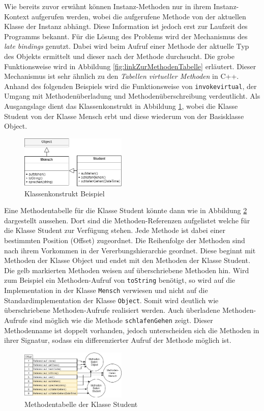 \documentclass[conference]{IEEEtran}
\begin{document}
Wie bereits zuvor erwähnt können Instanz-Methoden nur in ihrem Instanz-Kontext aufgerufen werden, wobei die aufgerufene Methode von der aktuellen Klasse der Instanz abhängt. Diese Information ist jedoch erst zur Laufzeit des Programms bekannt. Für die Lösung des Problems wird der Mechanismus des \textit{late bindings} genutzt. Dabei wird beim Aufruf einer Methode der aktuelle Typ des Objekts ermittelt und dieser nach der Methode durchsucht. Die grobe Funktionsweise wird in Abbildung \ref{fig:linkZurMethodenTabelle} erläutert. Dieser Mechanismus ist sehr ähnlich zu den \textit{Tabellen virtueller Methoden} in C++. Anhand des folgenden Beispiels wird die Funktionsweise von \verb|invokevirtual|, der Umgang mit Methodenüberladung und Methodenüberschreibung verdeutlicht. Als Ausgangslage dient das Klassenkonstrukt in Abbildung \ref{fig:umlHierarchie}, wobei die Klasse Student von der Klasse Mensch erbt und diese wiederum von der Basisklasse Object.
\begin{figure}[htbp] 
  \centering
     \includegraphics[width=0.45\textwidth]{Grafiken/UMLHierarchie.png}
  \caption{Klassenkonstrukt Beispiel}
  \label{fig:umlHierarchie}
\end{figure}
Eine Methodentabelle für die Klasse Student könnte dann wie in Abbildung \ref{fig:methodenTabelleUmlHierachie} dargestellt aussehen. Dort sind die Methoden-Referenzen aufgelistet  welche für die Klasse Student zur Verfügung stehen. Jede Methode ist dabei einer bestimmten Position (Offset) zugeordnet. Die Reihenfolge der Methoden sind nach ihrem Vorkommen in der Vererbungshierarchie geordnet. Diese beginnt mit Methoden der Klasse Object und endet mit den Methoden der Klasse Student. Die gelb markierten Methoden weisen auf überschriebene Methoden hin. Wird zum Beispiel ein Methoden-Aufruf von \verb|toString| benötigt, so wird auf die Implementation in der Klasse \verb|Mensch| verwiesen und nicht auf die Standardimplementation der Klasse \verb|Object|. Somit wird deutlich wie überschriebene Methoden-Aufrufe realisiert werden. Auch überladene Methoden-Aufrufe sind möglich wie die Methode \verb|schlafenGehen| zeigt. Dieser Methodenname ist doppelt vorhanden, jedoch unterscheiden sich die Methoden in ihrer Signatur, sodass ein differenzierter Aufruf der Methode möglich ist.\cite{Venners.1999}
\begin{figure}[htbp] 
  \centering
     \includegraphics[width=0.45\textwidth]{Grafiken/MethodenTabelleAusHierarchie.png}
  \caption{Methodentabelle der Klasse Student}
  \label{fig:methodenTabelleUmlHierachie}
\end{figure}
\end{document}
